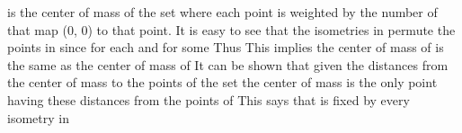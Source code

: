 \documentclass[11pt,oneside]{article}
\begin{document}
\begin{BookBody}
\noindent is the center of mass of the set  where each point is weighted by the number of  that map (0, 0) to that point. It is easy to see that the isometries in  permute the points in  since for each  and  for some  Thus   This implies the center of mass of  is the same as the center of mass of  It can be shown that given the distances from the center of mass to the points of the set  the center of mass is the only point having these distances from the points of  This says that  is fixed by every isometry in 

\end{BookBody}

\BookNarrativetrue
\end{document}
